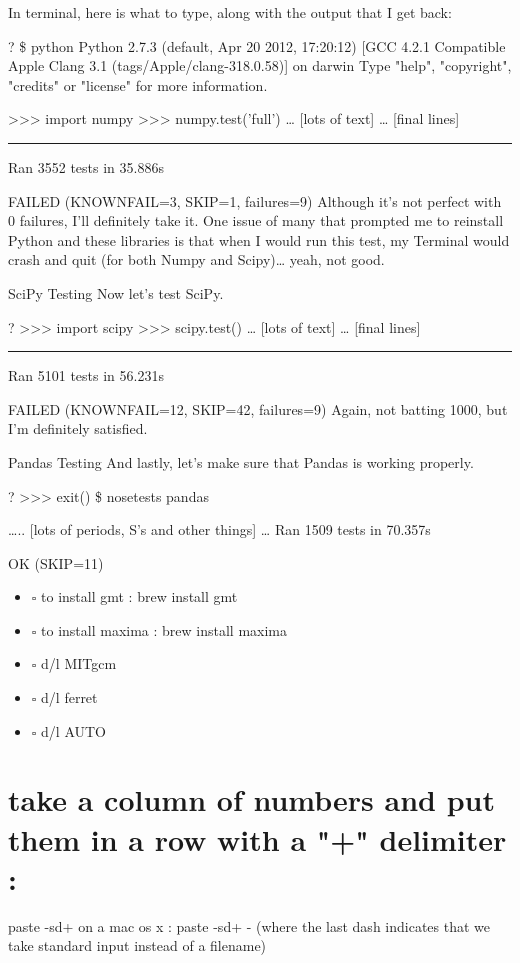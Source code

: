 \documentclass[11pt]{article}
\begin{document}
In terminal, here is what to type, along with the output that I get back:

?
\$ python
Python 2.7.3 (default, Apr 20 2012, 17:20:12)
[GCC 4.2.1 Compatible Apple Clang 3.1 (tags/Apple/clang-318.0.58)] on darwin
Type "help", "copyright", "credits" or "license" for more information.

>>> import numpy
>>> numpy.test('full')
\ldots{}
[lots of text]
\ldots{}
[final lines]

\rule{\linewidth}{0.5pt}
Ran 3552 tests in 35.886s

FAILED (KNOWNFAIL=3, SKIP=1, failures=9)
Although it’s not perfect with 0 failures, I’ll definitely take it. One issue of many that prompted me to reinstall Python and these libraries is that when I would run this test, my Terminal would crash and quit (for both Numpy and Scipy)… yeah, not good.

SciPy Testing
Now let’s test SciPy.

?
>>> import scipy
>>> scipy.test()
\ldots{}
[lots of text]
\ldots{}
[final lines]

\rule{\linewidth}{0.5pt}
Ran 5101 tests in 56.231s

FAILED (KNOWNFAIL=12, SKIP=42, failures=9)
Again, not batting 1000, but I’m definitely satisfied.

Pandas Testing
And lastly, let’s make sure that Pandas is working properly.

?
>>> exit()
\$ nosetests pandas

…..
[lots of periods, S's and other things]
…
Ran 1509 tests in 70.357s

OK (SKIP=11)


\begin{itemize}
\item $\square$ to install gmt : brew install gmt
\item $\square$ to install maxima : brew install maxima
\item $\square$ d/l MITgcm
\item $\square$ d/l ferret
\item $\square$ d/l AUTO
\end{itemize}

\section{take a column of numbers and put them in a row with a "+" delimiter :}
\label{sec-27}
paste -sd+
on a mac os x :
paste -sd+ -
(where the last dash indicates that we take standard input instead of a filename)
\end{document}
